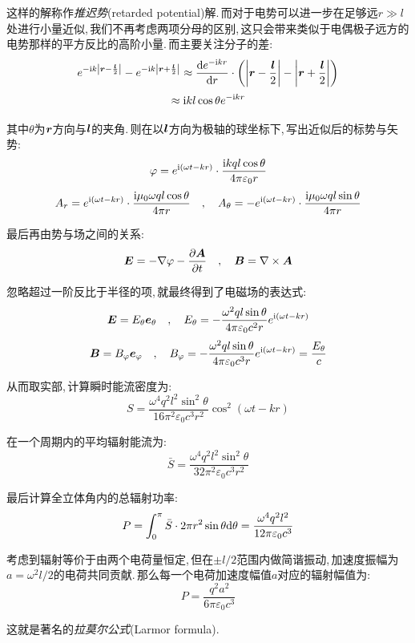 这样的解称作\emph{推迟势}(retarded potential)解.\,而对于电势可以进一步在足够远$r\gg l$处进行小量近似,\,我们不再考虑两项分母的区别,\,这只会带来类似于电偶极子远方的电势那样的平方反比的高阶小量.\,而主要关注分子的差:
\[e^{- {\rm i} k\left|\boldsymbol{r}-\frac{\boldsymbol{l}}{2}\right|}-e^{- {\rm i} k\left|\boldsymbol{r}+\frac{\boldsymbol{l}}{2}\right|}\approx \frac{\textrm{d} e^{-{\rm i} kr}}{\textrm{d} r}\cdot\left(\left|\boldsymbol{r}-\frac{\boldsymbol{l}}{2}\right|-\left|\boldsymbol{r}+\frac{\boldsymbol{l}}{2}\right|\right)\]
\[\approx {\rm i} kl\cos\theta e^{- {\rm i} kr}\]

其中$\theta$为$\boldsymbol{r}$方向与$\boldsymbol{l}$的夹角.\,则在以$\boldsymbol{l}$方向为极轴的球坐标下,\,写出近似后的标势与矢势:
\[\varphi=e^{{\rm i}(\omega t- kr)}\cdot\frac{{\rm i} kql\cos\theta}{4\pi\varepsilon_0 r} \]
\[A_r=e^{{\rm i}(\omega t- kr)}\cdot\frac{{\rm i} \mu_0\omega ql\cos\theta}{4\pi r}\quad ,\quad  A_\theta=-e^{{\rm i}(\omega t- kr)}\cdot\frac{{\rm i} \mu_0\omega ql\sin\theta}{4\pi r}\]

最后再由势与场之间的关系:
\[\boldsymbol{E}=-\nabla \varphi-\frac{\partial \boldsymbol{A}}{\partial t}\quad ,\quad\boldsymbol{B}=\nabla \times \boldsymbol{A}\]

忽略超过一阶反比于半径的项,\,就最终得到了电磁场的表达式:
\[\boldsymbol{E}=E_\theta \boldsymbol{e}_\theta\quad ,\quad E_\theta=-\frac{\omega^2 q l \sin\theta}{4\pi\varepsilon_0 c^2 r}e^{{\rm i}(\omega t- kr)}\]
\[\boldsymbol{B}=B_\varphi \boldsymbol{e}_\varphi\quad ,\quad B_\varphi=-\frac{\omega^2 q l \sin\theta}{4\pi\varepsilon_0 c^3 r}e^{{\rm i}(\omega t- kr)}=\frac{E_\theta}{c}\]

从而取实部,\,计算瞬时能流密度为:
\[S=\frac{\omega^4q^2l^2\sin^2\theta}{16\pi^2\varepsilon_0 c^3 r^2 }\cos^2(\omega t-kr)\]

在一个周期内的平均辐射能流为:
\[\bar{S}=\frac{\omega^4q^2l^2\sin^2\theta}{32\pi^2\varepsilon_0 c^3 r^2 }\]

最后计算全立体角内的总辐射功率:
\[P=\int_0^\pi \bar{S}\cdot 2\pi r^2\sin\theta\textrm{d} \theta=\frac{\omega^4q^2l^2}{12\pi\varepsilon_0 c^3  }\]

考虑到辐射等价于由两个电荷量恒定,\,但在$\pm l/2$范围内做简谐振动,\,加速度振幅为$a=\omega^2 l/2$的电荷共同贡献.\,那么每一个电荷加速度幅值$a$对应的辐射幅值为:
\[P=\frac{q^2a^2}{6\pi\varepsilon_0 c^3  }\]

这就是著名的\emph{拉莫尔公式}(Larmor formula).






